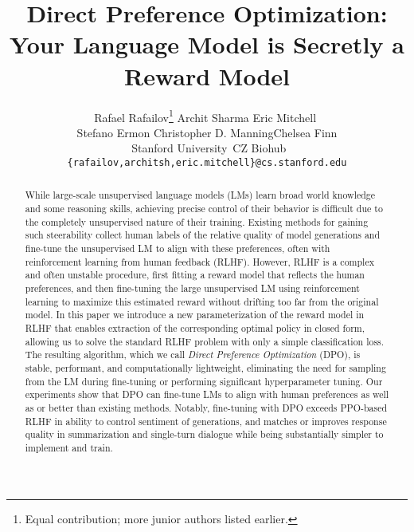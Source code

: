 \documentclass{article}
\title{Direct Preference Optimization:\\ Your Language Model is Secretly a Reward Model}
\author{%
  Rafael Rafailov\thanks{Equal contribution; more junior authors listed earlier.}\,\,\footnotemark[2] \And Archit Sharma\footnotemark[1]\,\,\footnotemark[2] \And Eric Mitchell\footnotemark[1]\,\,\footnotemark[2] \\
  \AND Stefano Ermon\footnotemark[2]\,\,\footnotemark[3] \And Christopher D. Manning\footnotemark[2] \And Chelsea Finn\footnotemark[2] \\
  \AND \textnormal{\footnotemark[2]\,\,Stanford University \footnotemark[3]\,\;CZ Biohub} \\
  \texttt{\{rafailov,architsh,eric.mitchell\}@cs.stanford.edu}
}
\newcommand{\rev}[2]{{#2}}
\begin{document}
\maketitle

\begin{abstract}
While large-scale unsupervised language models (LMs) learn broad world knowledge and some reasoning skills, achieving precise control of their behavior is difficult due to the completely unsupervised nature of their training.
Existing methods for gaining such steerability collect human labels of the relative quality of model generations and fine-tune the unsupervised LM to align with these preferences, often with reinforcement learning from human feedback (RLHF).
However, RLHF is a complex and often unstable procedure, first fitting a reward model that reflects the human preferences, and then fine-tuning the large unsupervised LM using reinforcement learning to maximize this estimated reward without drifting too far from the original model.
\rev{In this paper, we leverage a mapping between reward functions and optimal policies to show that this constrained reward maximization problem can be \emph{optimized exactly} with a single stage of policy training, essentially solving a classification problem on the human preference data.}{In this paper we introduce a new parameterization of the reward model in RLHF that enables extraction of the corresponding optimal policy in closed form, allowing us to solve the standard RLHF problem with only a simple classification loss.}
The resulting algorithm, which we call \textit{Direct Preference Optimization} (DPO), is stable, performant, and computationally lightweight, eliminating the need for \rev{fitting a reward model,}{} sampling from the LM during fine-tuning or performing significant hyperparameter tuning.
Our experiments show that DPO can fine-tune LMs to align with human preferences as well as or better than existing methods. Notably, fine-tuning with DPO exceeds PPO-based RLHF in ability to control sentiment of generations, and matches or improves response quality in summarization and single-turn dialogue while being substantially simpler to implement and train.

\end{abstract}
\end{document}
